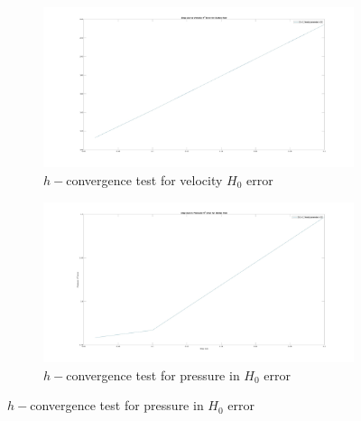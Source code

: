 \documentclass[a4paper,twoside,openright]{book}
\begin{document}
\begin{figure}
\begin{subfigure}{\textwidth}	
  \includegraphics[width=\linewidth]{h0_velocity_stokes.jpg}
  \caption{$h-$convergence test for velocity $H_0$ error}
  \label{fig:vel_stoke_conv_h0}
\end{subfigure}
\begin{subfigure}{\textwidth}	
  \includegraphics[width=\linewidth]{h0_pressure_stokes.jpg}
  \caption{$h-$convergence test for pressure in $H_0$ error}
  \label{fig:pre_stoke_conv_h0}
\end{subfigure}
\end{figure}
\end{document}
